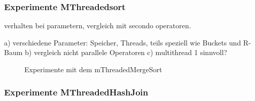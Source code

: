 \documentclass[a4paper,12pt,twoside]{article}
\begin{document}
\subsubsection{Experimente MThreadedsort}

verhalten bei parametern, vergleich mit secondo operatoren.

a) verschiedene Parameter: Speicher, Threads, teils speziell wie Buckets und R-Baum 
b) vergleich nicht parallele Operatoren
c) multithread 1 sinnvoll?



\begin{figure}
	\centering
	\qquad
	\qquad
	\caption{Experimente mit dem mThreadedMergeSort}
	\label{img:sortExpAllg}
\end{figure}


\subsubsection{Experimente MThreadedHashJoin}
\label{exp:hash}
\end{document}
